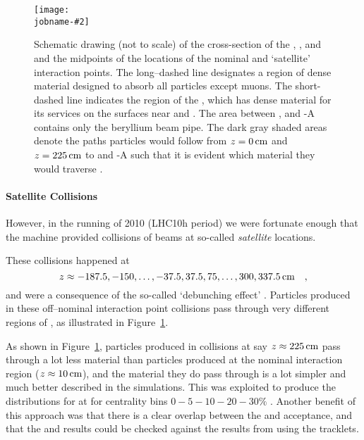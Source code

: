 \documentclass[compat,11pt]{alicenote}
\newcommand{\figref}[1]{Figure~\ref{#1}}
\newcommand\figinput[2][\textwidth]{%
  \texttt{[image: \\jobname-\#2]}}
\begin{document}
\begin{figure}[th!bp]
  \centering
  \figinput{satellite}
  \caption{Schematic drawing (not to scale) of the cross-section of
    the \ITS{}, \FMD{}, and \VZERO{} and the midpoints of the
    locations of the nominal and `satellite' interaction points. The
    long--dashed line designates a region of dense material designed
    to absorb all particles except muons. The short-dashed line
    indicates the region of the \ALICE{} \ITS{}, which has dense
    material for its services on the surfaces near  and
    . The area between ,  and \VZERO{}-A contains
    only the beryllium beam pipe. The dark gray shaded areas denote
    the paths particles would follow from $z=\unit[0]{\text{cm}}$ and
    $z=\unit[225]{\text{cm}}$ to  and \VZERO{}-A such that it
    is evident which material they would traverse
    \cite{Abbas:2013bpa}.}
  \label{fig:satellite_geom}
\end{figure}

\paragraph{Satellite Collisions} 
However, in the \PbPbCol{} running of 2010 (LHC10h period) we were
fortunate enough that the machine provided collisions of beams at
so-called \emph{satellite} locations.  

These collisions happened at
$$
z\approx-187.5,-150,\ldots,-37.5,37.5,75,\ldots,300,\unit[337.5]{\text{cm}}\quad,
$$ 
and were a consequence of the so-called `debunching effect'
\cite{maxime}.  Particles produced in these off--nominal interaction
point collisions pass through very different regions of \ALICE{}, as
illustrated in \figref{fig:satellite_geom}.  

As shown in \figref{fig:satellite_geom}, particles produced in
collisions at say $z\approx\unit[225]{\text{cm}}$ pass through a lot
less material than particles produced at the nominal interaction
region ($z\approx\unit[10]{\text{cm}}$), and the material they do pass
through is a lot simpler and much better described in the simulations.
This was exploited to produce the \ndndeta{} distributions for
\PbPbCol{} at  for centrality bins $0-5-10-20-30\%$
\cite{Abbas:2013bpa}.  Another benefit of this approach was that there
is a clear overlap between the \FMD{} and \VZERO{} acceptance, and
that the \VZERO{} and \FMD{} results could be checked against the
results from using the \SPD{} tracklets.
\end{document}
